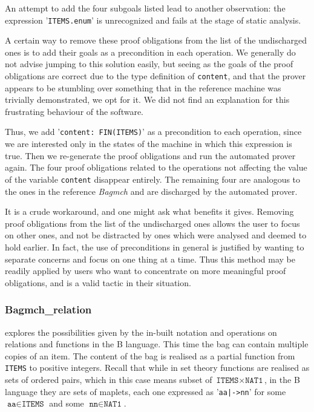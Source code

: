 \documentclass[11pt,journal]{IEEEtran}
\begin{document}
	An attempt to add the four subgoals listed lead to another observation: the expression '\texttt{ITEMS.enum}' is unrecognized and fails at the stage of static analysis.
	
	A certain way to remove these proof obligations from the list of the undischarged ones is to add their goals as a precondition in each operation. We generally do not advise jumping to this solution easily, but seeing as the goals of the proof obligations are correct due to the type definition of \texttt{content}, and that the prover appears to be stumbling over something that in the reference machine was trivially demonstrated, we opt for it. We did not find an explanation for this frustrating behaviour of the software.
	
	Thus, we add '\texttt{content: FIN(ITEMS)}' as a precondition to each operation, since we are interested only in the states of the machine in which this expression is true. Then we re-generate the proof obligations and run the automated prover again. The four proof obligations related to the operations not affecting the value of the variable \texttt{content} disappear entirely. The remaining four are analogous to the ones in the reference \emph{Bagmch} and are discharged by the automated prover.
	
	It is a crude workaround, and one might ask what benefits it gives. Removing proof obligations from the list of the undischarged ones allows the user to focus on other ones, and not be distracted by ones which were analysed and deemed to hold earlier. In fact, the use of preconditions in general is justified by wanting to separate concerns and focus on one thing at a time. Thus this method may be readily applied by users who want to concentrate on more meaningful proof obligations, and is a valid tactic in their situation.
	
	\subsubsection{Bagmch\_relation} explores the possibilities given by the in-built notation and operations on relations and functions in the B language. This time the bag can contain multiple copies of an item. The content of the bag is realised as a partial function from \texttt{ITEMS} to positive integers. Recall that while in set theory functions are realised as sets of ordered pairs, which in this case means subset of $\texttt{ITEMS} \times \texttt{NAT1}$, in the B language they are sets of maplets, each one expressed as '\texttt{aa|->nn}' for some $\texttt{aa} \in \texttt{ITEMS}$ and some $\texttt{nn} \in \texttt{NAT1}$.
	
\end{document}
